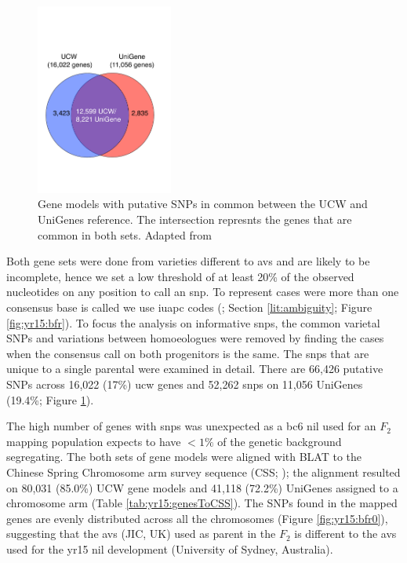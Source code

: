 \begin{figure}
    \includegraphics[width=0.4\textwidth]{Yr15/Figures/geneCounts.pdf} 
    \caption{Gene models with putative SNPs in common between the UCW and UniGenes reference. The intersection represnts the genes that are common in both sets. Adapted from \citet{Ramirez-Gonzalez2015b}}
    \label{fig:yr15:geneCount}
\end{figure}

Both gene sets were done from varieties different to \acrshort{avs} and are likely to be incomplete, hence we set a low threshold of at least 20\% of the observed nucleotides on any position to call an \acrshort{snp}. 
To represent cases were more than one consensus base is called we use \gls{iuapc} codes (\citet{Cornish-Bowden1985}; Section \ref{lit:ambiguity}; Figure \ref{fig:yr15:bfr}).  
To focus the analysis on informative \acrshort{snp}s, the common varietal SNPs and variations between homoeologues were removed by finding the cases when the consensus call on both progenitors is the same. 
The \acrshort{snp}s that are unique to a single parental were examined in detail. 
There are 66,426 putative SNPs across 16,022 (17\%) \acrshort{ucw} genes and 52,262 \acrshort{snp}s on 11,056 UniGenes (19.4\%; Figure \ref{fig:yr15:geneCount}).  




The high number of genes with \acrshort{snp}s was unexpected as a \acrshort{bc}6 \acrshort{nil} used for an $F_2$ mapping population expects to have $<1\%$ of the genetic background segregating. 
The both sets of gene models were aligned with BLAT \citep{Kent2002} to the Chinese Spring Chromosome arm survey sequence (CSS; \citealt{Mayer2014}); the alignment resulted on 80,031 (85.0\%) UCW gene models and 41,118 (72.2\%) UniGenes assigned to a chromosome arm (Table \ref{tab:yr15:genesToCSS}). 
The SNPs found in the mapped genes are evenly distributed across all the chromosomes (Figure \ref{fig:yr15:bfr0}), suggesting that the \acrlong{avs} (JIC, UK) used as parent in the $F_{2}$ is different to the \acrlong{avs} used for the \acrshort{yr15} \acrshort{nil} development (University of Sydney, Australia).  

